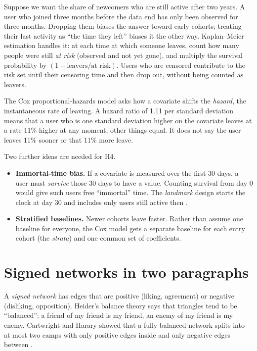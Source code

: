 Suppose we want the share of newcomers who are still active after two years. A user who joined three months before the data end has only been observed for three months. Dropping them biases the answer toward early cohorts; treating their last activity as ``the time they left'' biases it the other way. Kaplan--Meier estimation handles it: at each time at which someone leaves, count how many people were still \emph{at risk} (observed and not yet gone), and multiply the survival probability by $(1-\text{leavers}/\text{at risk})$. Users who are censored contribute to the risk set until their censoring time and then drop out, without being counted as leavers.

The Cox proportional-hazards model asks how a covariate shifts the \emph{hazard}, the instantaneous rate of leaving. A hazard ratio of 1.11 per standard deviation means that a user who is one standard deviation higher on the covariate leaves at a rate 11\% higher at any moment, other things equal. It does not say the user leaves 11\% sooner or that 11\% more leave.

Two further ideas are needed for H4.
\begin{itemize}
  \item \textbf{Immortal-time bias.} If a covariate is measured over the first 30 days, a user must \emph{survive} those 30 days to have a value. Counting survival from day 0 would give such users free ``immortal'' time. The \emph{landmark} design starts the clock at day 30 and includes only users still active then .
  \item \textbf{Stratified baselines.} Newer cohorts leave faster. Rather than assume one baseline for everyone, the Cox model gets a separate baseline for each entry cohort (the \emph{strata}) and one common set of coefficients.
\end{itemize}

\section{Signed networks in two paragraphs}
A \emph{signed network} has edges that are positive (liking, agreement) or negative (disliking, opposition). Heider's balance theory says that triangles tend to be ``balanced'': a friend of my friend is my friend, an enemy of my friend is my enemy. Cartwright and Harary showed that a fully balanced network splits into at most two camps with only positive edges inside and only negative edges between .

